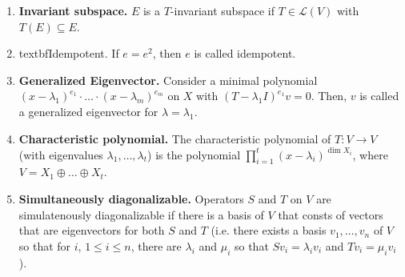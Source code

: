\begin{enumerate}
	\item \textbf{Invariant subspace. } $E$ is a $T$-invariant subspace if $T \in \mathscr{L}(V)$ with $T(E) \subseteq E$. 
	\item textbf{Idempotent. } If $e = e^2$, then $e$ is called idempotent. 
	\item \textbf{Generalized Eigenvector. } Consider a minimal polynomial $(x-\lambda_1)^{e_1} \cdot \dots \cdot (x-\lambda_m)^{e_m}$ on $X$ with $(T-\lambda_1I)^{e_1}v = 0$. Then, $v$ is called a generalized eigenvector for $\lambda = \lambda_1$. 
	\item \textbf{Characteristic polynomial. } The characteristic polynomial of $T: V \to V$ (with eigenvalues $\lambda_1,\dots,\lambda_t$) is the polynomial $\prod_{i=1}^{t} (x-\lambda_i)^{\dim X_i}$, where $V = X_1 \oplus \dots \oplus X_t$. 
	\item \textbf{Simultaneously diagonalizable. } Operators $S$ and $T$ on $V$ are simulatenously diagonalizable if there is a basis of $V$ that consts of vectors that are eigenvectors for both $S$ and $T$ (i.e. there exists a basis $v_1,\dots,v_n$ of $V$ so that for $i$, $1 \leq i \leq n$, there are $\lambda_i$ and $\mu_i$ so that $Sv_i = \lambda_iv_i$ and $Tv_i = \mu_iv_i$). 
\end{enumerate}


